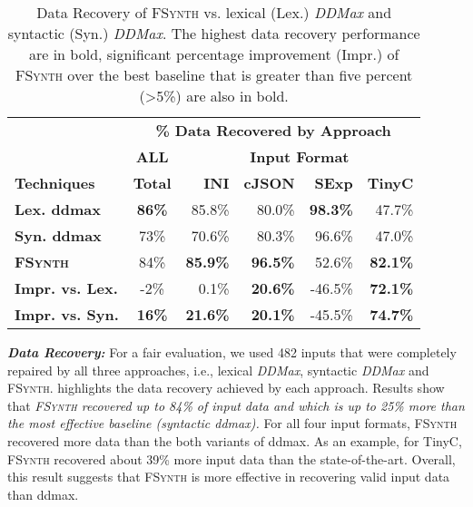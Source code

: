 \documentclass[sigconf,review,anonymous]{acmart}
\newcounter{todocounter}
\newcommand{\todo}[1]{\marginpar{$|$}\textcolor{red}{\stepcounter{todocounter}\footnote[\thetodocounter]{\textcolor{red}{\textbf{TODO }}\textit{#1}}}}
\newcommand{\recheck}[1]{\textcolor{red}{#1}}
\renewcommand{\todo}[1]{}
\newcommand{\approach}{\textsc{FSynth}\xspace}
\newcommand{\ddmax}{\textit{DDMax}\xspace}
\begin{document}
\begin{table}[!tbp]\centering
\caption{Data Recovery of \approach vs. %
lexical (Lex.) \ddmax and syntactic (Syn.) \ddmax. 
The highest data recovery performance are in bold, significant percentage improvement (Impr.) of \approach over the best baseline that is greater than five percent (>5\%) are also in bold.
}
\begin{tabular}{|l | c | r  r  r  r |}
\hline
&  \multicolumn{5}{c|}{\textbf{\% Data Recovered by Approach}}  \\
&  \multicolumn{1}{c|}{\textbf{ALL}} & \multicolumn{4}{c|}{\textbf{Input Format}}  \\
\textbf{Techniques} & \textbf{Total} & \textbf{INI} & \textbf{cJSON} & \textbf{SExp} & \textbf{TinyC} \\
\hline
\textbf{Lex. ddmax} & \textbf{86\%} & 85.8\% & 80.0\%	 & \textbf{98.3\%}	& 47.7\% \\			
\textbf{Syn. ddmax} & 73\% & 70.6\% & 80.3\%  & 96.6\%	& 47.0\% \\	
\hline
\textbf{\approach} & 84\% & \textbf{85.9\%} & \textbf{96.5\%} & 52.6\%	& \textbf{82.1\%} \\
\hline
\textbf{Impr. vs. Lex.} & -2\% & 0.1\%	& \textbf{20.6\%}	& -46.5\%	& \textbf{72.1\%} \\
\textbf{Impr. vs. Syn.} & \textbf{16\%} & \textbf{21.6\%} 	& \textbf{20.1\%}	& -45.5\%	& \textbf{74.7\% }\\
\hline
\end{tabular}
\label{tab:data-recovery}
\end{table}

\noindent
\textbf{\textit{Data Recovery:}} \todo{fix to new evaluation results}
For a fair evaluation, %
we used 482 inputs that were completely repaired by all three approaches, i.e., lexical \ddmax, syntactic \ddmax and \approach.  %
highlights the data %
recovery achieved by each approach. %
Results show that \textit{\approach recovered up to 84\% of input data and which is up to 25\% more than the most effective baseline (syntactic ddmax).} %
For all four input formats, \approach recovered more data than the both variants of ddmax. As an example, for TinyC, \approach recovered about 39\% more input data than the state-of-the-art.
Overall, this result suggests that \approach is more effective in recovering valid input data than ddmax.
\end{document}

